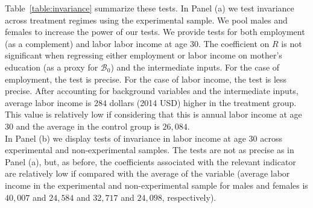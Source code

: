\noindent Table~\ref{table:invariance} summarize these tests. In Panel (a) we test invariance across treatment regimes using the experimental sample. We pool males and females to increase the power of our tests. We provide tests for both employment (as a complement) and labor labor income at age 30. The coefficient on $R$ is not significant when regressing either employment or labor income on mother's education (as a proxy for $\mathcal{B}_{0}$) and the intermediate inputs. For the case of employment, the test is precise. For the case of labor income, the test is less precise. After accounting for background variables and the intermediate inputs, average labor income is $284$ dollars (2014 USD) higher in the treatment group. This value is relatively low if considering that this is annual labor income at age 30 and the average in the control group is $26,084$.\\ 

\noindent In Panel (b) we display tests of invariance in labor income at age 30 across experimental and non-experimental samples. The tests are not as precise as in Panel (a), but, as before, the coefficients associated with the relevant indicator are relatively low if compared with the average of the variable (average labor income in the experimental and non-experimental sample for males and females is $40,007$ and $24,584$ and  $32,717$ and $24,098$, respectively).\\ 

